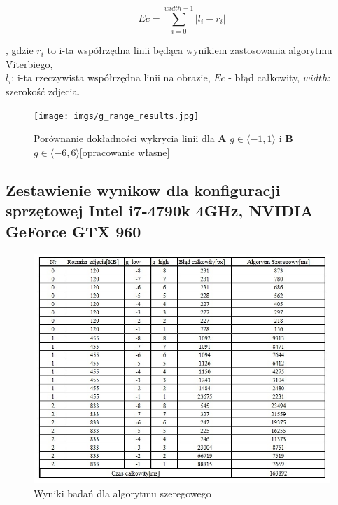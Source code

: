 \documentclass[document.tex]{subfiles}
\begin{document}
\begin{equation}
   Ec = \sum_{i=0}^{width - 1} |l_i - r_i|
    \label{eq:total_error}
\end{equation}

, gdzie $r_i$ to i-ta współrzędna linii będąca wynikiem zastosowania algorytmu Viterbiego, 
\\$l_i$: i-ta rzeczywista współrzędna linii na obrazie, $Ec$ - błąd całkowity, 
$width$: szerokość zdjecia.

\begin{figure}[h]
\texttt{[image: imgs/g\_range\_results.jpg]}
\caption{Porównanie dokładności wykrycia linii dla \textbf{A} $g\in \langle -1, 1 \rangle$ i 
\textbf{B} $g\in \langle -6, 6 \rangle$[opracowanie własne]}
\label{fig:g_range_results}
\end{figure}

\clearpage
\subsection{Zestawienie wynikow dla konfiguracji sprzętowej 
Intel i7-4790k 4GHz, NVIDIA GeForce GTX 960}


\begin{figure}[h]
\includegraphics[scale=0.75]{imgs/results_pc_serial}
\caption{Wyniki badań dla algorytmu szeregowego}
\label{fig:results_pc_serial}
\end{figure}
\end{document}
